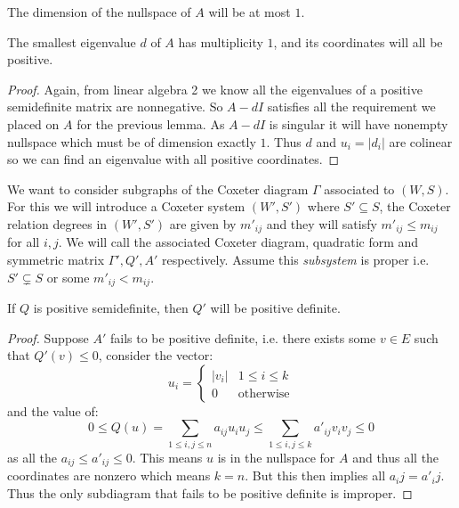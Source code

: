 \documentclass[../main.tex]{subfiles}
\begin{document}
\begin{corollary}
    The dimension of the nullspace of $A$ will be at most $1$.
\end{corollary}

\begin{lemma}
    The smallest eigenvalue $d$ of $A$ has multiplicity $1$, and its coordinates will all be positive.
    \begin{proof}
        Again, from linear algebra 2 we know all the eigenvalues of a positive semidefinite matrix are nonnegative. So $A-dI$ satisfies all the requirement we placed on $A$ for the previous lemma. As $A-dI$ is singular it will have nonempty nullspace which must be of dimension exactly $1$. Thus $d$ and $u_i = |d_i|$ are colinear so we can find an eigenvalue with all positive coordinates.
    \end{proof}
\end{lemma}

We want to consider subgraphs of the Coxeter diagram $\Gamma$ associated to $(W,S)$. For this we will introduce a Coxeter system $(W',S')$ where $S'\subseteq S$, the Coxeter relation degrees in $(W',S')$ are given by $m'_{ij}$ and they will satisfy $m'_{ij}\leq m_{ij}$ for all $i,j$. We will call the associated Coxeter diagram, quadratic form and symmetric matrix $\Gamma', Q', A'$ respectively. Assume this \textit{subsystem} is proper i.e. $S'\subsetneq S$ or some $m'_{ij}<m_{ij}$.

\begin{proposition}
    If $Q$ is positive semidefinite, then $Q'$ will be positive definite.
    \begin{proof}
        Suppose $A'$ fails to be positive definite, i.e. there exists some $v\in E$ such that $Q'(v)\leq 0$, consider the vector:\[
            u_i = \begin{cases}
                |v_i| & 1\leq i \leq k\\
                0 & \text{otherwise}
            \end{cases}
        \] and the value of: \[
        0\leq Q(u) = \sum_{1\leq i,j\leq n} a_{ij}u_i u_j \leq \sum_{1\leq i,j\leq k} a'_{ij}v_i v_j \leq 0
        \] as all the $a_{ij}\leq a'_{ij}\leq 0$. This means $u$ is in the nullspace for $A$ and thus all the coordinates are nonzero which means $k=n$. But this then implies all $a_ij = a'_ij$. Thus the only subdiagram that fails to be positive definite is improper.
    \end{proof}
\end{proposition}
\end{document}
